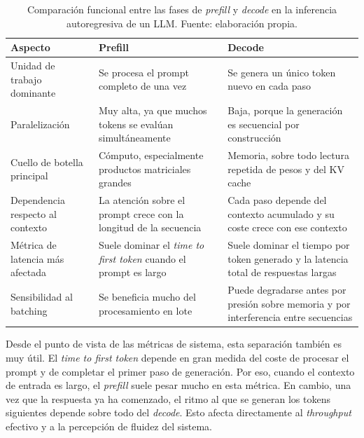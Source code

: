 \begin{table}[H]
\centering
\small
\begin{tabularx}{0.98\textwidth}{>{\raggedright\arraybackslash}p{3.1cm} >{\raggedright\arraybackslash}X >{\raggedright\arraybackslash}X}
\toprule
\textbf{Aspecto} & \textbf{Prefill} & \textbf{Decode} \\
\midrule
Unidad de trabajo dominante &
Se procesa el prompt completo de una vez &
Se genera un único token nuevo en cada paso \\

Paralelización &
Muy alta, ya que muchos tokens se evalúan simultáneamente &
Baja, porque la generación es secuencial por construcción \\

Cuello de botella principal &
Cómputo, especialmente productos matriciales grandes &
Memoria, sobre todo lectura repetida de pesos y del KV cache \\

Dependencia respecto al contexto &
La atención sobre el prompt crece con la longitud de la secuencia &
Cada paso depende del contexto acumulado y su coste crece con ese contexto \\

Métrica de latencia más afectada &
Suele dominar el \textit{time to first token} cuando el prompt es largo &
Suele dominar el tiempo por token generado y la latencia total de respuestas largas \\

Sensibilidad al batching &
Se beneficia mucho del procesamiento en lote &
Puede degradarse antes por presión sobre memoria y por interferencia entre secuencias \\

\bottomrule
\end{tabularx}
\caption{Comparación funcional entre las fases de \textit{prefill} y \textit{decode} en la inferencia autoregresiva de un LLM. Fuente: elaboración propia.}
\label{tab:prefill-decode-kv}
\end{table}

Desde el punto de vista de las métricas de sistema, esta separación también es muy útil. El \textit{time to first token} depende en gran medida del coste de procesar el prompt y de completar el primer paso de generación. Por eso, cuando el contexto de entrada es largo, el \textit{prefill} suele pesar mucho en esta métrica. En cambio, una vez que la respuesta ya ha comenzado, el ritmo al que se generan los tokens siguientes depende sobre todo del \textit{decode}. Esto afecta directamente al \textit{throughput} efectivo y a la percepción de fluidez del sistema.

